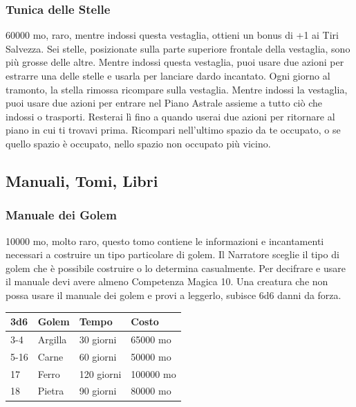 \begin{multicols}{2}

	\medskip

	\subsubsection*{Tunica delle Stelle}
	60000 mo, raro, mentre indossi questa vestaglia, ottieni un bonus di +1 ai Tiri Salvezza. Sei stelle, posizionate sulla parte superiore frontale della vestaglia, sono più grosse delle altre. Mentre indossi questa vestaglia, puoi usare due azioni per estrarre una delle stelle e usarla per lanciare dardo incantato. Ogni giorno al tramonto, la stella rimossa ricompare sulla vestaglia. Mentre indossi la vestaglia, puoi usare due azioni per entrare nel Piano Astrale assieme a tutto ciò che indossi o trasporti. Resterai lì fino a quando userai due azioni per ritornare al piano in cui ti trovavi prima. Ricompari nell'ultimo spazio da te occupato, o se quello spazio è occupato, nello spazio non occupato più vicino.

	\subsection{Manuali, Tomi, Libri}


	\subsubsection*{Manuale dei Golem}
	10000 mo, molto raro, questo tomo contiene le informazioni e incantamenti necessari a costruire un tipo particolare di golem. Il Narratore sceglie il tipo di golem che è possibile costruire o lo determina casualmente. Per decifrare e usare il manuale devi avere almeno Competenza Magica 10. Una creatura che non possa usare il manuale dei golem e provi a leggerlo, subisce 6d6 danni da forza.

	\medskip

	\begin{tabular}{llll}
		3d6 &Golem &Tempo &Costo\\
		\hline
		3-4 &Argilla &30 giorni &65000 mo\\
		5-16 &Carne &60 giorni& 50000 mo\\
		17 &Ferro &120 giorni &100000 mo\\
		18 &Pietra& 90 giorni &80000 mo\\
	\end{tabular}



\end{multicols}
